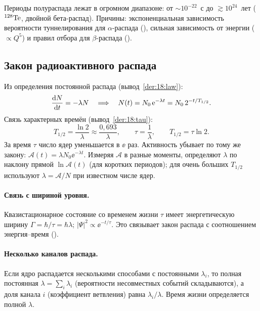 Периоды полураспада лежат в огромном диапазоне: от $\sim10^{-22}$~с до $\gtrsim10^{24}$~лет ($\nucl{Te}{128}$, двойной бета-распад).
Причины: экспоненциальная зависимость вероятности туннелирования для $\alpha$-распада (), сильная зависимость
от энергии ($\propto Q^5$) и правил отбора для $\beta$-распада ().

\subsection{Закон радиоактивного распада}

Из определения постоянной распада (вывод~\ref{der:18:law}):
\begin{equation}\label{eq:18:law}
  \diff{N}{t}=-\lambda N\quad\Longrightarrow\quad N(t)=N_0\,\ee^{-\lambda t}=N_0\,2^{-t/T_{1/2}} .
\end{equation}
Связь характерных времён (вывод~\ref{der:18:tau}):
\begin{equation}\label{eq:18:times}
  T_{1/2}=\frac{\ln2}{\lambda}\approx\frac{0{,}693}{\lambda},\qquad \tau=\frac1\lambda,\qquad T_{1/2}=\tau\ln2 .
\end{equation}
За время $\tau$ число ядер уменьшается в $\ee$ раз. Активность убывает по тому же закону: $\mathcal A(t)=\lambda N_0\ee^{-\lambda t}$.
Измеряя $\mathcal A$ в разные моменты, определяют $\lambda$ по наклону прямой $\ln\mathcal A(t)$ (для коротких периодов); для
очень больших $T_{1/2}$ используют $\lambda=\mathcal A/N$ при известном числе ядер.

\paragraph{Связь с шириной уровня.} Квазистационарное состояние со временем жизни $\tau$ имеет энергетическую ширину
$\Gamma=\hbar/\tau=\hbar\lambda$; $|\Psi|^2\propto\ee^{-t/\tau}$. Это связывает закон распада с соотношением энергия--время ().

\paragraph{Несколько каналов распада.} Если ядро распадается несколькими способами с постоянными $\lambda_i$, то полная
постоянная $\lambda=\sum_i\lambda_i$ (вероятности несовместных событий складываются), а доля канала $i$ (коэффициент
ветвления) равна $\lambda_i/\lambda$. Время жизни определяется полной $\lambda$.


